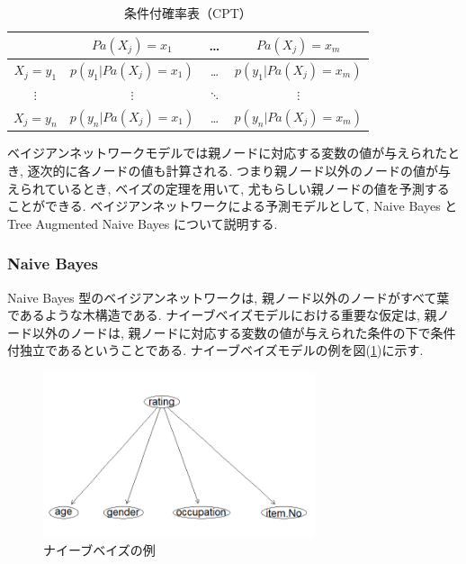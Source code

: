 \documentclass[a4paper]{jarticle}
\begin{document}
\begin{table}[H]
\begin{center}
\caption{条件付確率表（CPT）}   %
\label{cpt}   %
\begin{tabular}{|c||c|c|c|}   %
\hline
 & $Pa(X_{j})=x_{1}$ & \dots & $Pa(X_{j})=x_{m}$
\\ \hline
$X_j=y_1$ & $p(y_1|Pa(X_j)=x_1)$ & \dots & $p(y_1|Pa(X_j)=x_m)$
\\ \hline
$\vdots$ & $\vdots$ & $\ddots$ & $\vdots$
\\ \hline
$X_j=y_n$ & $ p(y_n|Pa(X_j)=x_1)$ & \dots & $p(y_n|Pa(X_j)=x_m)$
\\ \hline
\end{tabular}
\end{center}
\end{table}

ベイジアンネットワークモデルでは親ノードに対応する変数の値が与えられたとき, 逐次的に各ノードの値も計算される. つまり親ノード以外のノードの値が与えられているとき, ベイズの定理を用いて, 尤もらしい親ノードの値を予測することができる. ベイジアンネットワークによる予測モデルとして, Naive Bayes と Tree Augmented Naive Bayes について説明する.

\subsubsection{Naive Bayes}

Naive Bayes 型のベイジアンネットワークは, 親ノード以外のノードがすべて葉であるような木構造である. ナイーブベイズモデルにおける重要な仮定は, 親ノード以外のノードは, 親ノードに対応する変数の値が与えられた条件の下で条件付独立であるということである. ナイーブベイズモデルの例を図(\ref{naive})に示す.

\begin{figure}[H]
 \begin{center}
  \includegraphics[width=80mm]{data/sample1.png}
 \end{center}
 \caption{ナイーブベイズの例}
 \label{naive}
\end{figure}
\end{document}
